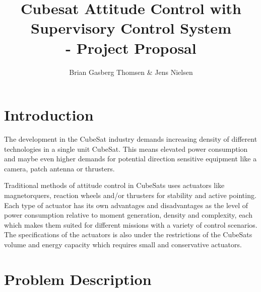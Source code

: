 \documentclass[10pt,a4paper,oneside,openany,article]{memoir}
\title{\vspace{-2cm} Cubesat Attitude Control with Supervisory Control System \\ \Large - Project Proposal}
\author{Brian Gasberg Thomsen \& Jens Nielsen}
\begin{document}
\maketitle

\chapter{Introduction}
The development in the CubeSat industry demands increasing density of different technologies in a single unit CubeSat. This means elevated power consumption and maybe even higher demands for potential direction sensitive equipment like a camera, patch antenna or thrusters. 

Traditional methods of attitude control in CubeSats uses actuators like magnetorquers, reaction wheels and/or thrusters for stability and active pointing. Each type of actuator has its own advantages and disadvantages as the level of power consumption relative to moment generation, density and complexity, each which makes them suited for different missions with a variety of control scenarios. The specifications of the actuators is also under the restrictions of the CubeSats volume and energy capacity which requires small and conservative actuators.

\chapter{Problem Description}

\end{document}
